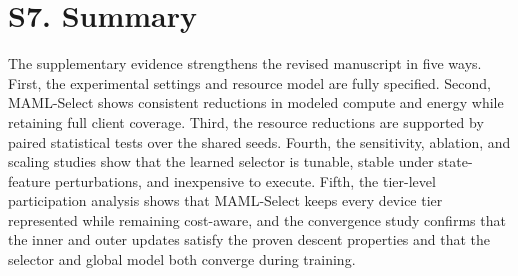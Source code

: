 \documentclass[10pt]{article}
\begin{document}
\section*{S7. Summary}

The supplementary evidence strengthens the revised manuscript in five ways.  First, the experimental settings and resource model are fully specified.  Second, MAML-Select shows consistent reductions in modeled compute and energy while retaining full client coverage.  Third, the resource reductions are supported by paired statistical tests over the shared seeds.  Fourth, the sensitivity, ablation, and scaling studies show that the learned selector is tunable, stable under state-feature perturbations, and inexpensive to execute.  Fifth, the tier-level participation analysis shows that MAML-Select keeps every device tier represented while remaining cost-aware, and the convergence study confirms that the inner and outer updates satisfy the proven descent properties and that the selector and global model both converge during training.
\end{document}
